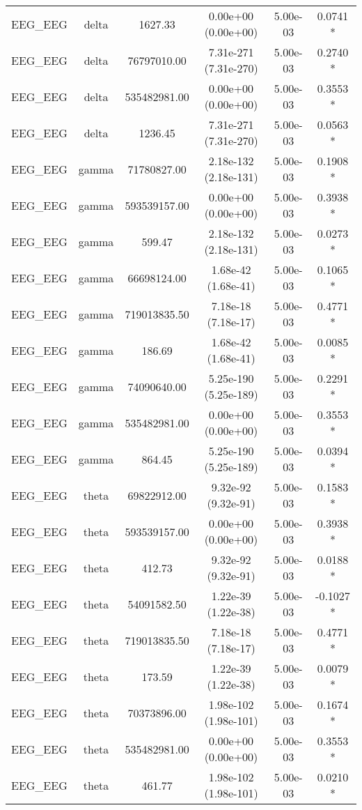 \begin{tabular}{lccccc}
EEG\_EEG & delta & 1627.33 & 0.00e+00 (0.00e+00) & 5.00e-03 & 0.0741 * \\
EEG\_EEG & delta & 76797010.00 & 7.31e-271 (7.31e-270) & 5.00e-03 & 0.2740 * \\
EEG\_EEG & delta & 535482981.00 & 0.00e+00 (0.00e+00) & 5.00e-03 & 0.3553 * \\
EEG\_EEG & delta & 1236.45 & 7.31e-271 (7.31e-270) & 5.00e-03 & 0.0563 * \\
EEG\_EEG & gamma & 71780827.00 & 2.18e-132 (2.18e-131) & 5.00e-03 & 0.1908 * \\
EEG\_EEG & gamma & 593539157.00 & 0.00e+00 (0.00e+00) & 5.00e-03 & 0.3938 * \\
EEG\_EEG & gamma & 599.47 & 2.18e-132 (2.18e-131) & 5.00e-03 & 0.0273 * \\
EEG\_EEG & gamma & 66698124.00 & 1.68e-42 (1.68e-41) & 5.00e-03 & 0.1065 * \\
EEG\_EEG & gamma & 719013835.50 & 7.18e-18 (7.18e-17) & 5.00e-03 & 0.4771 * \\
EEG\_EEG & gamma & 186.69 & 1.68e-42 (1.68e-41) & 5.00e-03 & 0.0085 * \\
EEG\_EEG & gamma & 74090640.00 & 5.25e-190 (5.25e-189) & 5.00e-03 & 0.2291 * \\
EEG\_EEG & gamma & 535482981.00 & 0.00e+00 (0.00e+00) & 5.00e-03 & 0.3553 * \\
EEG\_EEG & gamma & 864.45 & 5.25e-190 (5.25e-189) & 5.00e-03 & 0.0394 * \\
EEG\_EEG & theta & 69822912.00 & 9.32e-92 (9.32e-91) & 5.00e-03 & 0.1583 * \\
EEG\_EEG & theta & 593539157.00 & 0.00e+00 (0.00e+00) & 5.00e-03 & 0.3938 * \\
EEG\_EEG & theta & 412.73 & 9.32e-92 (9.32e-91) & 5.00e-03 & 0.0188 * \\
EEG\_EEG & theta & 54091582.50 & 1.22e-39 (1.22e-38) & 5.00e-03 & -0.1027 * \\
EEG\_EEG & theta & 719013835.50 & 7.18e-18 (7.18e-17) & 5.00e-03 & 0.4771 * \\
EEG\_EEG & theta & 173.59 & 1.22e-39 (1.22e-38) & 5.00e-03 & 0.0079 * \\
EEG\_EEG & theta & 70373896.00 & 1.98e-102 (1.98e-101) & 5.00e-03 & 0.1674 * \\
EEG\_EEG & theta & 535482981.00 & 0.00e+00 (0.00e+00) & 5.00e-03 & 0.3553 * \\
EEG\_EEG & theta & 461.77 & 1.98e-102 (1.98e-101) & 5.00e-03 & 0.0210 * \\
\bottomrule
\end{tabular}